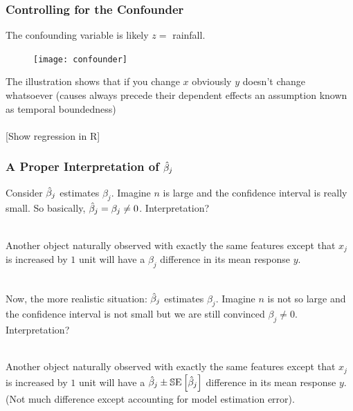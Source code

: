 \documentclass[handout]{beamer}
\begin{document}
\begin{frame}\frametitle{Controlling for the Confounder}

The confounding variable is likely $z = $ rainfall.

\begin{figure}
\centering
\texttt{[image: confounder]}
\end{figure}

The illustration shows that if you change $x$ obviously $y$ doesn't change whatsoever (causes always precede their dependent effects an assumption known as temporal boundedness) \\~\\

[Show regression in R]

\end{frame}

\begin{frame}\frametitle{A Proper Interpretation of $\hat{\beta}_j$}

Consider $\hat{\beta}_j$ estimates $\beta_j$. Imagine $n$ is large and the confidence interval is really small. So basically, $\hat{\beta}_j = \beta_j \neq 0$. Interpretation? \\~\\ \pause

Another object naturally observed with exactly the same features except that $x_j$ is increased by $1$ unit will have a $\beta_j$ difference in its mean response $y$.\\~\\ \pause

Now, the more realistic situation: $\hat{\beta}_j$ estimates $\beta_j$. Imagine $n$ is not so large and the confidence interval is not small but we are still convinced $\beta_j \neq 0$.  Interpretation? \\~\\ \pause

Another object naturally observed with exactly the same features except that $x_j$ is increased by $1$ unit will have a \pause $\hat{\beta}_j \pm \mathbb{S}\text{E}\left[\hat{\beta}_j\right]$ difference in its mean response $y$. (Not much difference except accounting for model estimation error).\\~\\

\end{frame}
\end{document}
